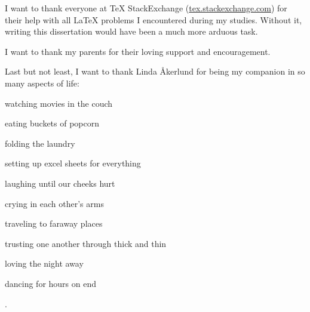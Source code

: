 \begin{acknowledgements}
  I want to thank everyone at \TeX{} StackExchange
  ({\url{tex.stackexchange.com}}) for their help with all
  \LaTeX{} problems I encountered during my studies.
  Without it, writing this dissertation would have been a much more arduous
  task.

  I want to thank my parents for their loving support and encouragement.

  Last but not least, I want to thank Linda \r{A}kerlund for being my companion
  in so many aspects of life:
  \begin{inlinelist}[itemjoin={, }, itemjoin*={, and}]
    \item watching movies in the couch
    \item eating buckets of popcorn
    \item folding the laundry
    \item setting up excel sheets for everything
    \item laughing until our cheeks hurt
    \item crying in each other's arms
    \item traveling to faraway places
    \item trusting one another through thick and thin
    \item loving the night away
    \item dancing for hours on end
  \end{inlinelist}.
\end{acknowledgements}
